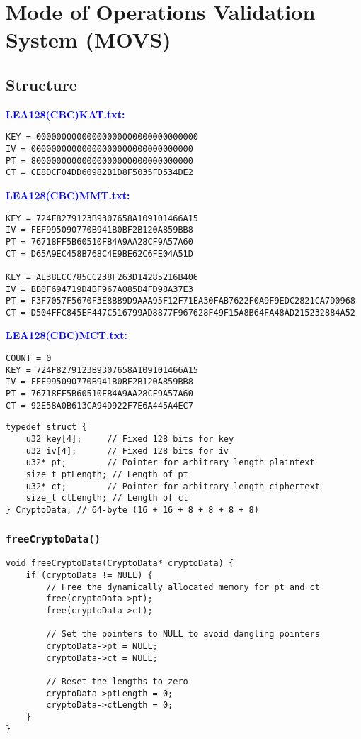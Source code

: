 \chapter{Mode of Operations Validation System (MOVS)}

\section{Structure}
\textcolor{blue}{\bf LEA128(CBC)KAT.txt:}
\begin{lstlisting}
KEY = 00000000000000000000000000000000
IV = 00000000000000000000000000000000
PT = 80000000000000000000000000000000
CT = CE8DCF04DD60982B1D8F5035FD534DE2
\end{lstlisting}
\vspace{4pt}
\textcolor{blue}{\bf LEA128(CBC)MMT.txt:}
\begin{lstlisting}
KEY = 724F8279123B9307658A109101466A15
IV = FEF995090770B941B0BF2B120A859BB8
PT = 76718FF5B60510FB4A9AA28CF9A57A60
CT = D65A9EC458B768C4E9BE62C6FE04A51D

KEY = AE38ECC785CC238F263D14285216B406
IV = BB0F694719D4BF967A085D4FD98A37E3
PT = F3F7057F5670F3E8BB9D9AAA95F12F71EA30FAB7622F0A9F9EDC2821CA7D0968
CT = D504FFC845EF447C516799AD8877F967628F49F15A8B64FA48AD215232884A52
\end{lstlisting}
\vspace{4pt}
\textcolor{blue}{\bf LEA128(CBC)MCT.txt:}
\begin{lstlisting}
COUNT = 0
KEY = 724F8279123B9307658A109101466A15
IV = FEF995090770B941B0BF2B120A859BB8
PT = 76718FF5B60510FB4A9AA28CF9A57A60
CT = 92E58A0B613CA94D922F7E6A445A4EC7
\end{lstlisting}
\vspace{12pt}

\begin{lstlisting}[style=C]
typedef struct {
	u32 key[4];     // Fixed 128 bits for key
	u32 iv[4];      // Fixed 128 bits for iv
	u32* pt;        // Pointer for arbitrary length plaintext
	size_t ptLength; // Length of pt
	u32* ct;        // Pointer for arbitrary length ciphertext
	size_t ctLength; // Length of ct
} CryptoData; // 64-byte (16 + 16 + 8 + 8 + 8 + 8)
\end{lstlisting}

\newpage
\subsection{\texttt{freeCryptoData()}}
\begin{lstlisting}[style=C]
void freeCryptoData(CryptoData* cryptoData) {
	if (cryptoData != NULL) {
		// Free the dynamically allocated memory for pt and ct
		free(cryptoData->pt);
		free(cryptoData->ct);
		
		// Set the pointers to NULL to avoid dangling pointers
		cryptoData->pt = NULL;
		cryptoData->ct = NULL;
		
		// Reset the lengths to zero
		cryptoData->ptLength = 0;
		cryptoData->ctLength = 0;
	}
}
\end{lstlisting}

